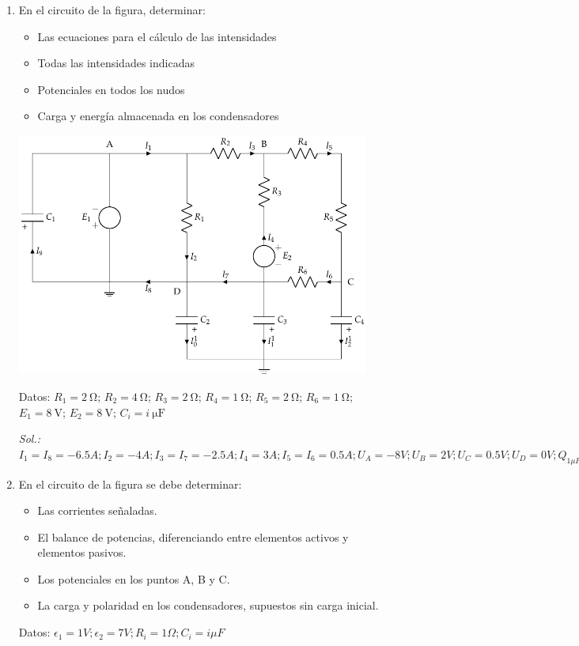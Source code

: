 \begin{enumerate}
\item En el circuito de la figura, determinar:
  \begin{itemize}
  \item Las ecuaciones para el cálculo de las intensidades
  \item Todas las intensidades indicadas
  \item Potenciales en todos los nudos
  \item Carga y energía almacenada en los condensadores
  \end{itemize}
  
  \begin{center}
    \includegraphics[height=8cm]{../figs/ej11_BT1.pdf}
  \end{center}


  Datos: $R_1 = \qty{2}{\ohm}$; $R_2 = \qty{4}{\ohm}$; $R_3 = \qty{2}{\ohm}$; $R_4 = \qty{1}{\ohm}$; $R_5 = \qty{2}{\ohm}$; $R_6 = \qty{1}{\ohm}$; $E_1 = \qty{8}{\volt}$; $E_2 = \qty{8}{\volt}$; $C_i = \qty[parse-numbers=false]{i}{\micro\farad}$

  \emph{Sol.:
    $I_1=I_8=-6.5A; I_2=-4A; I_3=I_7=-2.5A; I_4=3A; I_5=I_6=0.5A; U_A=-8V;
    U_B=2V; U_C=0.5V; U_D=0V;Q_{1\mu F}=8\mu C; Q_{2\mu F}=Q_{3\mu
      F}=0\mu C; Q_{4\mu F}=-2\mu C; E_{1\mu F}=32\mu F; E_{2\mu
      F}=E_{3\mu F}=0 J; E_{4\mu F}=0.5\mu C$}

\item En el circuito de la figura se debe determinar:
  \begin{itemize}
  \item Las corrientes señaladas.
  \item El balance de potencias, diferenciando entre elementos activos
    y elementos pasivos.
  \item Los potenciales en los puntos A, B y C.
  \item La carga y polaridad en los condensadores, supuestos sin carga
    inicial.
  \end{itemize}
  Datos:
  $\epsilon_1 ={1}V; \epsilon_2 ={7}V; R_i = {1}\Omega; C_i = {i}{\mu
    F}$


\end{enumerate}
